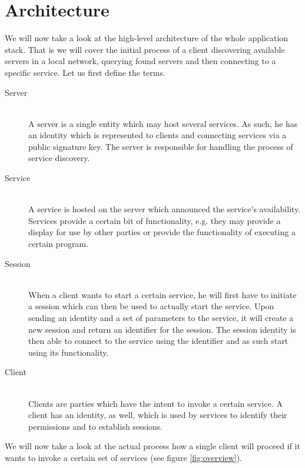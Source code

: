 \section{Architecture}
\label{sec:architecture}

We will now take a look at the high-level architecture of the whole application stack.
That is we will cover the initial process of a client discovering available servers in a local network, querying found servers and then connecting to a specific service.
Let us first define the terms.

\begin{description}
    \item[Server]\hfill\\
        A server is a single entity which may host several services.
        As such, he has an identity which is represented to clients and connecting services via a public signature key.
        The server is responsible for handling the process of service discovery.
    \item[Service]\hfill\\
        A service is hosted on the server which announced the service's availability.
        Services provide a certain bit of functionality, e.g. they may provide a display for use by other parties or provide the functionality of executing a certain program.
    \item[Session]\hfill\\
        When a client wants to start a certain service, he will first have to initiate a session which can then be used to actually start the service.
        Upon sending an identity and a set of parameters to the service, it will create a new session and return an identifier for the session.
        The session identity is then able to connect to the service using the identifier and as such start using its functionality.
    \item[Client]\hfill\\
        Clients are parties which have the intent to invoke a certain service.
        A client has an identity, as well, which is used by services to identify their permissions and to establish sessions.
\end{description}

We will now take a look at the actual process how a single client will proceed if it wants to invoke a certain set of services (see figure \ref{fig:overview}).

